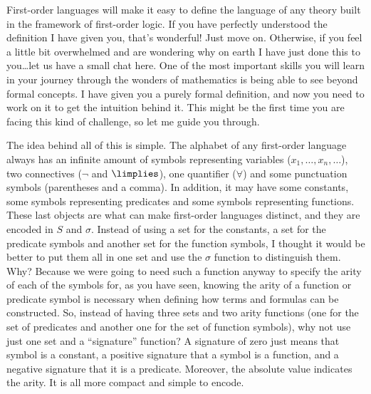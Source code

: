 \begin{para}
First-order languages will make it easy to define the language of any theory built in the framework of first-order logic.
If you have perfectly understood the definition I have given you, that's wonderful! Just move on.
Otherwise, if you feel a little bit overwhelmed and are wondering why on earth I have just done this to you\ldots let us have a small chat here.
One of the most important skills you will learn in your journey through the wonders of mathematics is being able to see beyond formal concepts.
I have given you a purely formal definition, and now you need to work on it to get the intuition behind it.
This might be the first time you are facing this kind of challenge, so let me guide you through.

The idea behind all of this is simple.
The alphabet of any first-order language always has an infinite amount of symbols representing variables ($x_1,\ldots,x_n,\ldots$), two connectives ($\lnot$ and $\limplies$), one quantifier ($\forall$) and some punctuation symbols (parentheses and a comma).
In addition, it may have some constants, some symbols representing predicates and some symbols representing functions.
These last objects are what can make first-order languages distinct, and they are encoded in $S$ and $\sigma$.
Instead of using  a set for the constants, a set for the predicate symbols and another set for the function symbols, I thought it would be better to put them all in one set and use the $\sigma$ function to distinguish them.
Why? Because we were going to need such a function anyway to specify the arity of each of the symbols for, as you have seen, knowing the arity of a function or predicate symbol is necessary when defining how terms and formulas can be constructed.
So, instead of having three sets and two arity functions (one for the set of predicates and another one for the set of function symbols), why not use just one set and a ``signature'' function? A signature of zero just means that symbol is a constant, a positive signature that a symbol is a function, and a negative signature that it is a predicate. Moreover, the absolute value indicates the arity. It is all more compact and simple to encode. 
\end{para}

